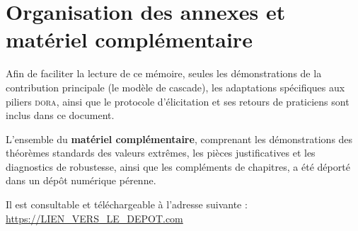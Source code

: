 \documentclass[11pt,a4paper]{report}
\begin{document}
\chapter*{Organisation des annexes et matériel complémentaire}

Afin de faciliter la lecture de ce mémoire, seules les démonstrations de la contribution
principale (le modèle de cascade), les adaptations spécifiques aux piliers \textsc{dora},
ainsi que le protocole d'élicitation et ses retours de praticiens sont inclus dans ce
document.

L'ensemble du \textbf{matériel complémentaire}, comprenant les démonstrations des théorèmes
standards des valeurs extrêmes, les pièces justificatives et les diagnostics de robustesse,
ainsi que les compléments de chapitres, a été déporté dans un dépôt numérique pérenne.

Il est consultable et téléchargeable à l'adresse suivante :
\url{https://LIEN_VERS_LE_DEPOT.com}



{\NoAutoSpacing}
\end{document}
